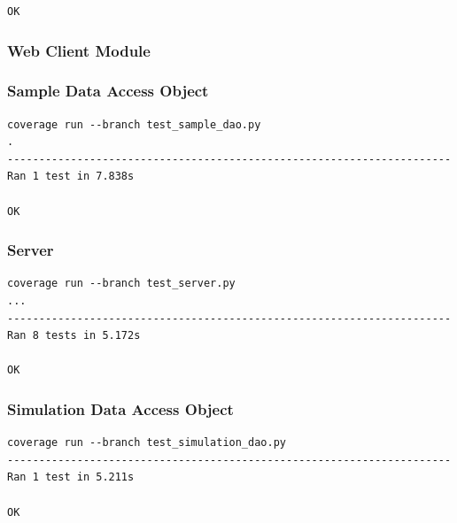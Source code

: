 \documentclass[a4paper,11pt]{article}
\begin{document}
\begin{appendices}
\begin{verbatim}
OK
\end{verbatim}

\subsubsection{Web Client Module}
\subsubsection*{Sample Data Access Object}
\begin{verbatim}
coverage run --branch test_sample_dao.py 
.
----------------------------------------------------------------------
Ran 1 test in 7.838s

OK
\end{verbatim}

\subsubsection*{Server}
\begin{verbatim}
coverage run --branch test_server.py
...
----------------------------------------------------------------------
Ran 8 tests in 5.172s

OK
\end{verbatim}

\subsubsection*{Simulation Data Access Object}
\begin{verbatim}
coverage run --branch test_simulation_dao.py
----------------------------------------------------------------------
Ran 1 test in 5.211s

OK
\end{verbatim}

\end{appendices}
\end{document}
